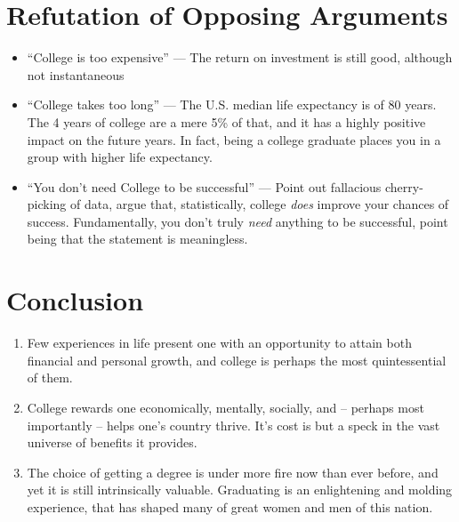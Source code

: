 \documentclass{article}
\begin{document}
\section{Refutation of Opposing Arguments}
\begin{itemize}
    \item ``College is too expensive'' --- The return on investment is still good, although 
    not instantaneous
    \item ``College takes too long'' --- The U.S. median life expectancy is of 80 years. 
    The 4 years of college are a mere 5\% of that, and it has a highly positive 
    impact on the future years. In fact, being a college graduate places you in a group 
    with higher life expectancy.
    \item ``You don't need College to be successful'' --- Point out fallacious 
    cherry-picking of data, argue that, statistically, college \emph{does} improve your 
    chances of success. Fundamentally, you don't truly \emph{need} anything to be successful, 
    point being that the statement is meaningless. 
\end{itemize}
\section{Conclusion}
\begin{enumerate}[label=\Alph*.]
    \item Few experiences in life present one with an opportunity to attain both
    financial and personal growth, and college is perhaps the most quintessential 
    of them.
    \item College rewards one economically, mentally, socially, and -- perhaps most
    importantly -- helps one's country thrive. It's cost is but a speck in the vast
    universe of benefits it provides.
    \item The choice of getting a degree is under more fire now than ever before,
    and yet it is still intrinsically valuable. Graduating is an enlightening and 
    molding experience, that has shaped many of great women and men of this nation.  
\end{enumerate}
\end{document}
